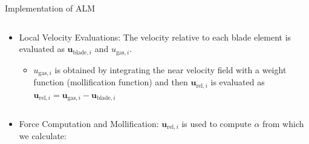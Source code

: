 \documentclass[10pt]{beamer}
\begin{document}
\begin{frame}{Implementation of ALM}
\begin{columns}
\begin{column}{0.90\textwidth}
\begin{itemize}
\item[\ding{252}] {\color{um6pcolor} Local Velocity Evaluations}: The velocity relative to each blade element is evaluated as $\mathbf{u}_{\text{blade},i}$ and $u_{\text{gas},i}$.
\begin{itemize}
\item[\ding{212}] $u_{\text{gas},i}$ is obtained by integrating the near velocity field with a weight function (mollification function) and then $\mathbf{u}_{\text{rel},i}$ is evaluated as $\mathbf{u}_{\text{rel},i}=\mathbf{u}_{\text{gas},i}-\mathbf{u}_{\text{blade},i}$
\end{itemize}
\end{itemize}
\end{column}
\begin{column}{0.20\textwidth}
\end{column}
\end{columns}
\noindent\makebox[\linewidth]{\rule{\paperwidth}{0.4pt}}
\begin{columns}
\begin{column}{0.90\textwidth}
\begin{itemize}
\item[\ding{252}] {\color{um6pcolor} Force Computation and Mollification}: $\mathbf{u}_{\text{rel},i}$ is used to compute $\alpha$ from which we calculate:

\end{itemize}
\end{column}
\end{columns}
\end{frame}
\end{document}
